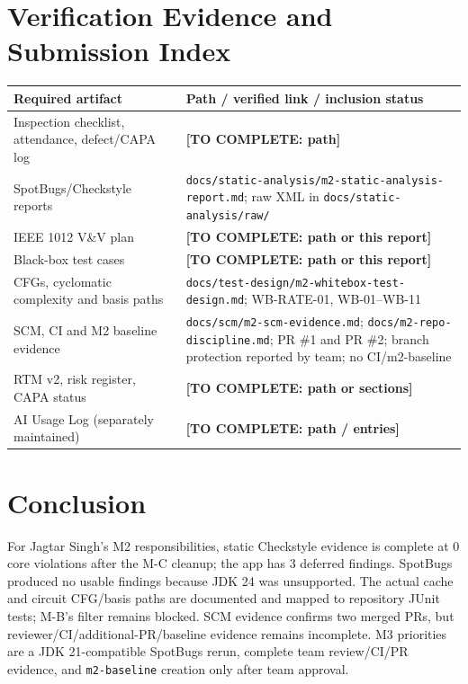 \documentclass[11pt,a4paper]{article}
\newcommand{\todo}[1]{\textcolor{red!70!black}{\textbf{[TO COMPLETE: #1]}}}
\newcommand{\evidence}[1]{\texttt{#1}}
\begin{document}
\section{Verification Evidence and Submission Index}
\begin{longtable}{L{5.1cm} L{7.6cm}}\toprule
\textbf{Required artifact} & \textbf{Path / verified link / inclusion status}\\\midrule\endhead
Inspection checklist, attendance, defect/CAPA log & \todo{path}\\
SpotBugs/Checkstyle reports & \evidence{docs/static-analysis/m2-static-analysis-report.md}; raw XML in \evidence{docs/static-analysis/raw/}\\
IEEE 1012 V\&V plan & \todo{path or this report}\\
Black-box test cases & \todo{path or this report}\\
CFGs, cyclomatic complexity and basis paths & \evidence{docs/test-design/m2-whitebox-test-design.md}; WB-RATE-01, WB-01--WB-11\\
SCM, CI and M2 baseline evidence & \evidence{docs/scm/m2-scm-evidence.md}; \evidence{docs/m2-repo-discipline.md}; PR \#1 and PR \#2; branch protection reported by team; no CI/m2-baseline\\
RTM v2, risk register, CAPA status & \todo{path or sections}\\
AI Usage Log (separately maintained) & \todo{path / entries}\\\bottomrule\end{longtable}
\section*{Conclusion}
For Jagtar Singh's M2 responsibilities, static Checkstyle evidence is complete at 0 core violations after the M-C cleanup; the app has 3 deferred findings. SpotBugs produced no usable findings because JDK 24 was unsupported. The actual cache and circuit CFG/basis paths are documented and mapped to repository JUnit tests; M-B's filter remains blocked. SCM evidence confirms two merged PRs, but reviewer/CI/additional-PR/baseline evidence remains incomplete. M3 priorities are a JDK 21-compatible SpotBugs rerun, complete team review/CI/PR evidence, and \texttt{m2-baseline} creation only after team approval.
\end{document}
